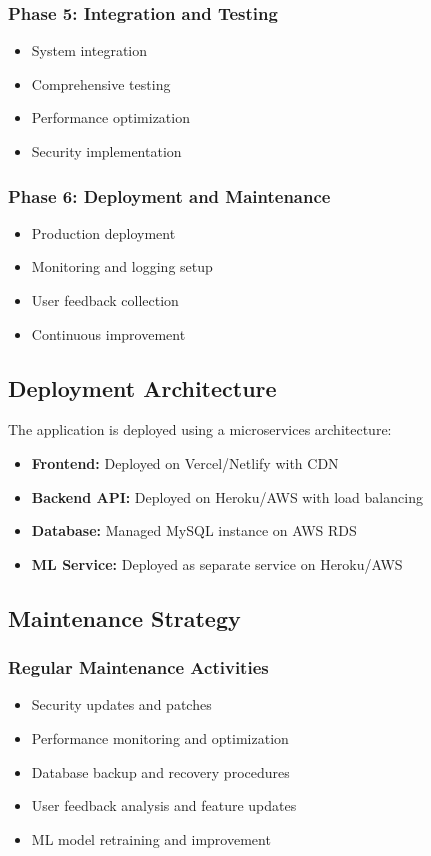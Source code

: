 \documentclass[12pt,a4paper]{article}
\begin{document}
\subsubsection{Phase 5: Integration and Testing}
\begin{itemize}
    \item System integration
    \item Comprehensive testing
    \item Performance optimization
    \item Security implementation
\end{itemize}

\subsubsection{Phase 6: Deployment and Maintenance}
\begin{itemize}
    \item Production deployment
    \item Monitoring and logging setup
    \item User feedback collection
    \item Continuous improvement
\end{itemize}

\subsection{Deployment Architecture}

The application is deployed using a microservices architecture:

\begin{itemize}
    \item \textbf{Frontend:} Deployed on Vercel/Netlify with CDN
    \item \textbf{Backend API:} Deployed on Heroku/AWS with load balancing
    \item \textbf{Database:} Managed MySQL instance on AWS RDS
    \item \textbf{ML Service:} Deployed as separate service on Heroku/AWS
\end{itemize}

\subsection{Maintenance Strategy}

\subsubsection{Regular Maintenance Activities}
\begin{itemize}
    \item Security updates and patches
    \item Performance monitoring and optimization
    \item Database backup and recovery procedures
    \item User feedback analysis and feature updates
    \item ML model retraining and improvement
\end{itemize}
\end{document}
